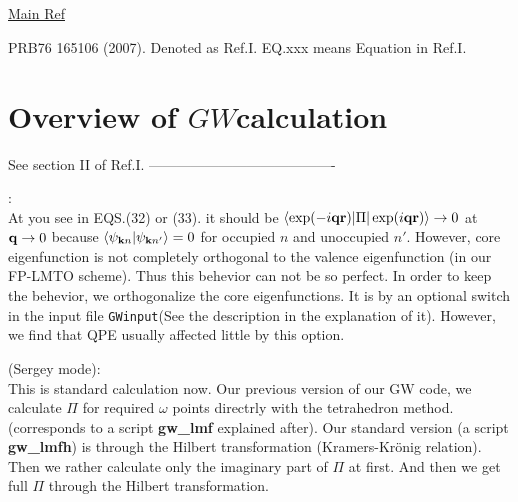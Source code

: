 \documentclass[a4paper,10pt,epsf,fleqn]{article}
\newcommand{\GW}{$GW$}
\newcommand{\keyw}[1]{\fbox{\tt #1}}
\newcommand{\bfq}{{\bf q}}
\newcommand{\bfk}{{\bf k}}
\newcommand{\bfr}{{\bf r}}
\begin{document}
 \

 \

\underline{Main Ref}

PRB76 165106 (2007). Denoted as Ref.I.
EQ.xxx means Equation in Ref.I.
 

\newpage
\section{Overview of \GW calculation}
See section II of Ref.I. 
----------------------------------------\\
\vspace{1cm}

:\\
At you see in EQS.(32) or (33).
it should be $\langle \exp(-i \bfq \bfr) | \Pi | \exp(i \bfq \bfr) \rangle \to 0$ 
at $\bfq \to 0$ because $\langle \psi_{\bfk n} | \psi_{\bfk n'}\rangle=0$
for occupied $n$ and unoccupied $n'$.
However, core eigenfunction is not completely orthogonal
to the valence eigenfunction (in our FP-LMTO scheme). 
Thus this behevior can not be so perfect.
In order to keep the behevior, we orthogonalize
the core eigenfunctions. It is by an optional switch
\keyw{CoreOrth} in the input file {\tt GWinput}(See the description in the explanation of it). 
However, we find that QPE  usually affected little by this option.

\vspace{1cm}
 (Sergey mode):\\
This is standard calculation now.
Our previous version of our GW code, we calculate $\Pi$ 
for required $\omega$ points directrly with the tetrahedron method. 
(corresponds to a script {\bf gw\_lmf} explained after).
Our standard version (a script {\bf gw\_lmfh}) is through
the Hilbert transformation (Kramers-Kr\"onig relation).
Then we rather calculate only the imaginary part of $\Pi$
at first. And then we get full $\Pi$ through the Hilbert transformation.

\end{document}
